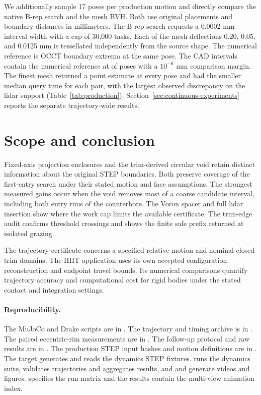 \documentclass[10pt,a4paper]{article}
\begin{document}
We additionally sample 17 poses per production motion and directly compare the native B-rep search and the mesh BVH. Both use original placements and boundary distances in millimeters. The B-rep search requests a 0.0002 mm interval width with a cap of 30,000 tasks. Each of the mesh deflections 0.20, 0.05, and 0.0125 mm is tessellated independently from the source shape. The numerical reference is OCCT boundary extrema at the same pose. The CAD intervals contain the numerical reference at \ProductionOracleAgreement{} of \ProductionOraclePoses{} poses with a \(10^{-6}\) mm comparison margin. The finest mesh returned a point estimate at every pose and had the smaller median query time for each pair, with the largest observed discrepancy on the lidar support (Table~\ref{tab:production}). Section~\ref{sec:continuous-experiments} reports the separate trajectory-wide results.

\ifdefined\EngineBenchmarkRows

\fi

\section{Scope and conclusion}

Fixed-axis projection enclosures and the trim-derived circular void
retain distinct information about the original STEP boundaries. Both
preserve coverage of the first-entry search under their stated motion
and face assumptions. The strongest measured gains occur when the
void removes most of a coarse candidate interval, including both
entry rims of the counterbore. The Voron spacer and full lidar insertion
show where the work cap limits the available certificate. The trim-edge
audit confirms threshold crossings and shows the finite safe prefix
returned at isolated grazing.

The trajectory certificate concerns a specified relative motion and
nominal closed trim domains. The HHT application uses its own accepted
configuration reconstruction and endpoint travel bounds. Its numerical
comparisons quantify trajectory accuracy and computational cost for
rigid bodies under the stated contact and integration settings.

\paragraph{Reproducibility.}
The MuJoCo and Drake scripts are in . The trajectory and timing archive is in .
The paired eccentric-rim measurements are in . The follow-up protocol and raw results are in . The production STEP input hashes and motion definitions are in . The  target generates and reads the dynamics STEP fixtures.  runs the dynamics suite,  validates trajectories and aggregates results, and  and  generate videos and figures.  specifies the run matrix and the results contain the multi-view animation index.



\end{document}
